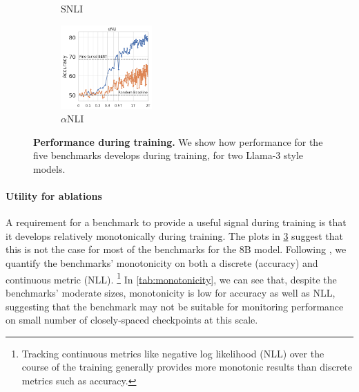 \begin{figure}[t]
\begin{subfigure}[b]{0.19\textwidth}
    \caption{SNLI}
    \label{fig:snli_int}
    \end{subfigure}
    \begin{subfigure}[b]{0.19\textwidth}
    \centering
    \includegraphics[height=3.2cm, trim=11mm 0 0 0, clip]{figures/abductivenli_intermediate}
    \caption{$\alpha$NLI}
    \label{fig:alphanli_int}
    \end{subfigure}
    \caption{\textbf{Performance during training.} We show how performance for the five benchmarks develops during training, for two Llama-3 style models.}\label{fig:performance_training}
\end{figure}

\paragraph{Utility for ablations}
A requirement for a benchmark to provide a useful signal during training is that it develops relatively monotonically during training.
The plots in \cref{fig:performance_training} suggest that this is not the case for most of the benchmarks for the 8B model.
Following \citet{variancepaper}, we quantify the benchmarks' monotonicity on both a discrete (accuracy) and continuous metric (NLL).%
\footnote{Tracking continuous metrics like negative log likelihood (NLL) over the course of the training generally provides more monotonic results than discrete metrics such as accuracy.}
In \cref{tab:monotonicity}, we can see that, despite the benchmarks' moderate sizes, monotonicity is low for accuracy as well as NLL, suggesting that the benchmark may not be suitable for monitoring performance on small number of closely-spaced checkpoints at this scale. %

